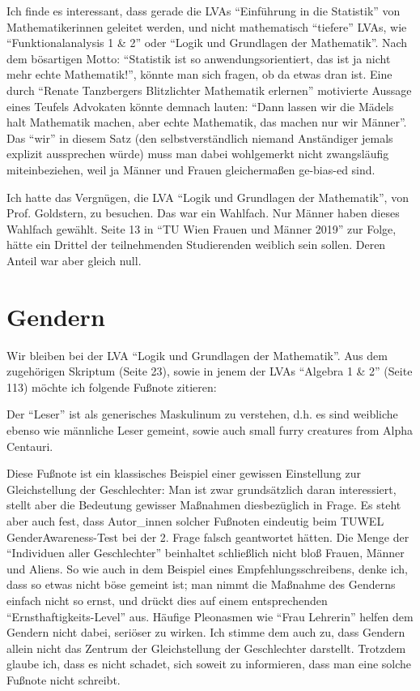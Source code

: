 \documentclass{article}
\begin{document}
Ich finde es interessant, dass gerade die LVAs \enquote{Einführung in die Statistik} von Mathematikerinnen geleitet werden, und nicht mathematisch \enquote{tiefere} LVAs, wie \enquote{Funktionalanalysis 1 \& 2} oder \enquote{Logik und Grundlagen der Mathematik}.
Nach dem bösartigen Motto:
\enquote{Statistik ist so anwendungsorientiert, das ist ja nicht mehr echte Mathematik!},
könnte man sich fragen, ob da etwas dran ist.
Eine durch \enquote{Renate Tanzbergers Blitzlichter Mathematik erlernen} motivierte Aussage eines Teufels Advokaten könnte demnach lauten:
\enquote{Dann lassen wir die Mädels halt Mathematik machen, aber echte Mathematik, das machen nur wir Männer}.
Das \enquote{wir} in diesem Satz (den selbstverständlich niemand Anständiger jemals explizit aussprechen würde) muss man dabei wohlgemerkt nicht zwangsläufig miteinbeziehen, weil ja Männer und Frauen gleichermaßen ge-bias-ed sind.

Ich hatte das Vergnügen, die LVA \enquote{Logik und Grundlagen der Mathematik}, von Prof. Goldstern, zu besuchen.
Das war ein Wahlfach.
Nur Männer haben dieses Wahlfach gewählt.
Seite 13 in \enquote{TU Wien Frauen und Männer 2019} zur Folge, hätte ein Drittel der teilnehmenden Studierenden weiblich sein sollen.
Deren Anteil war aber gleich null.

\section*{Gendern}

Wir  bleiben bei der LVA \enquote{Logik und Grundlagen der Mathematik}.
Aus dem zugehörigen Skriptum (Seite 23), sowie in jenem der LVAs \enquote{Algebra 1 \& 2} (Seite 113) möchte ich folgende Fußnote zitieren:

\begin{displayquote}
	Der \enquote{Leser} ist als generisches Maskulinum zu verstehen, d.h. es sind weibliche ebenso wie männliche Leser gemeint, sowie auch small furry creatures from Alpha Centauri.
\end{displayquote}

Diese Fußnote ist ein klassisches Beispiel einer gewissen Einstellung zur Gleichstellung der Geschlechter:
Man ist zwar grundsätzlich daran interessiert, stellt aber die Bedeutung gewisser Maßnahmen diesbezüglich in Frage.
Es steht aber auch fest, dass Autor\_innen solcher Fußnoten eindeutig beim TUWEL GenderAwareness-Test bei der 2. Frage falsch geantwortet hätten.
Die Menge der \enquote{Individuen aller Geschlechter} beinhaltet schließlich nicht bloß Frauen, Männer und Aliens.
So wie auch in dem Beispiel eines Empfehlungsschreibens, denke ich, dass so etwas nicht böse gemeint ist;
man nimmt die Maßnahme des Genderns einfach nicht so ernst, und drückt dies auf einem entsprechenden \enquote{Ernsthaftigkeits-Level} aus.
Häufige Pleonasmen wie \enquote{Frau Lehrerin} helfen dem Gendern nicht dabei, seriöser zu wirken.
Ich stimme dem auch zu, dass Gendern allein nicht das Zentrum der Gleichstellung der Geschlechter darstellt.
Trotzdem glaube ich, dass es nicht schadet, sich soweit zu informieren, dass man eine solche Fußnote nicht schreibt.
\end{document}
